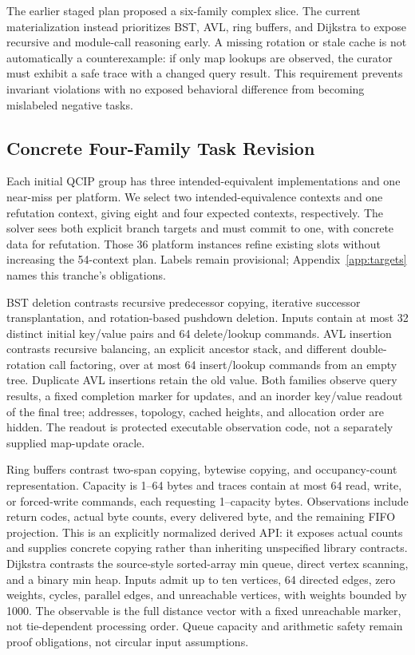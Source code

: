\documentclass{article}
\begin{document}
The earlier staged plan proposed a six-family complex slice. The current materialization instead prioritizes BST, AVL, ring buffers, and Dijkstra to expose recursive and module-call reasoning early. A missing rotation or stale cache is not automatically a counterexample: if only map lookups are observed, the curator must exhibit a safe trace with a changed query result. This requirement prevents invariant violations with no exposed behavioral difference from becoming mislabeled negative tasks.

\subsection{Concrete Four-Family Task Revision}
\label{sec:concrete}

Each initial QCIP group has three intended-equivalent implementations and one near-miss per platform. We select two intended-equivalence contexts and one refutation context, giving eight and four expected contexts, respectively. The solver sees both explicit branch targets and must commit to one, with concrete data for refutation. Those 36 platform instances refine existing slots without increasing the 54-context plan. Labels remain provisional; Appendix~\ref{app:targets} names this tranche's obligations.

BST deletion contrasts recursive predecessor copying, iterative successor transplantation, and rotation-based pushdown deletion. Inputs contain at most 32 distinct initial key/value pairs and 64 delete/lookup commands. AVL insertion contrasts recursive balancing, an explicit ancestor stack, and different double-rotation call factoring, over at most 64 insert/lookup commands from an empty tree. Duplicate AVL insertions retain the old value. Both families observe query results, a fixed completion marker for updates, and an inorder key/value readout of the final tree; addresses, topology, cached heights, and allocation order are hidden. The readout is protected executable observation code, not a separately supplied map-update oracle.

Ring buffers contrast two-span copying, bytewise copying, and occupancy-count representation. Capacity is 1--64 bytes and traces contain at most 64 read, write, or forced-write commands, each requesting 1--capacity bytes. Observations include return codes, actual byte counts, every delivered byte, and the remaining FIFO projection. This is an explicitly normalized derived API: it exposes actual counts and supplies concrete copying rather than inheriting unspecified library contracts. Dijkstra contrasts the source-style sorted-array min queue, direct vertex scanning, and a binary min heap. Inputs admit up to ten vertices, 64 directed edges, zero weights, cycles, parallel edges, and unreachable vertices, with weights bounded by 1000. The observable is the full distance vector with a fixed unreachable marker, not tie-dependent processing order. Queue capacity and arithmetic safety remain proof obligations, not circular input assumptions.
\end{document}
